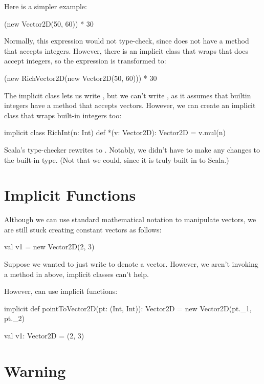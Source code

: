 \documentclass{book}
\begin{document}
Here is a simpler example:
\begin{scalacode}
(new Vector2D(50, 60)) * 30
\end{scalacode}
Normally, this expression would not type-check, since 
does not have a method \scalainline{*} that accepts integers. However, there is
an implicit class that wraps  that does accept
integers, so the expression is transformed to:
\begin{scalacode}
(new RichVector2D(new Vector2D(50, 60))) * 30
\end{scalacode}


The  implicit class lets us write
, but we can't write
, as it assumes that builtin
integers have a \scalainline{*} method that accepts vectors. However,
we can create an implicit class that wraps built-in integers too:

\begin{scalacode}
implicit class RichInt(n: Int) {
  def *(v: Vector2D): Vector2D = v.mul(n)
}
\end{scalacode}

Scala's type-checker rewrites  to .
Notably, we didn't have to make any changes to the built-in 
type. (Not that we could, since it is truly built in to Scala.)

\section{Implicit Functions}

Although we can use standard mathematical notation to manipulate
vectors, we are still stuck creating constant vectors as follows:
\begin{scalacode}
val v1 = new Vector2D(2, 3)
\end{scalacode}
Suppose we wanted to just write  to denote a vector.
However, we aren't invoking a method in above, implicit classes can't help.

However, can use implicit functions:
\begin{scalacode}
implicit def pointToVector2D(pt: (Int, Int)): Vector2D = {
  new Vector2D(pt._1, pt._2)
}

val v1: Vector2D = (2, 3)
\end{scalacode}

\section{Warning}
\end{document}
